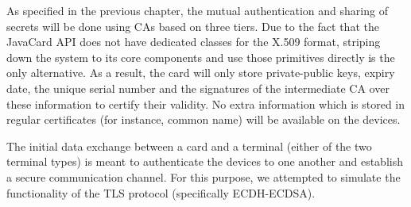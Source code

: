 As specified in the previous chapter, the mutual authentication and sharing of secrets will be done using CAs based on three tiers. Due to the fact that the JavaCard API does not have dedicated classes for the X.509 format, striping down the system to its core components and use those primitives directly is the only alternative. As a result, the card will only store private-public keys, expiry date, the unique serial number and the signatures of the intermediate CA over these information to certify their validity. No extra information which is stored in regular certificates (for instance, common name) will be available on the devices.

The initial data exchange between a card and a terminal (either of the two terminal types) is meant to authenticate the devices to one another and establish a secure communication channel. For this purpose, we attempted to simulate the functionality of the TLS protocol (specifically ECDH-ECDSA). 

